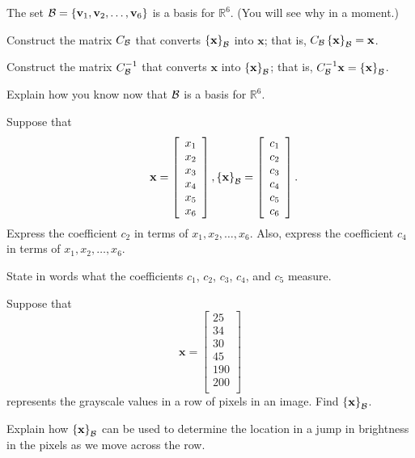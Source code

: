 \documentclass[12pt]{article}
\newcommand{\vs}[1]{\vspace{#1in}}
\newcommand{\vvec}{{\mathbf v}}
\newcommand{\xvec}{{\mathbf x}}
\newcommand{\real}{{\mathbb R}}
\newcommand{\bcal}{{\cal B}}
\newcommand{\coords}[2]{\left\{#1\right\}_{#2}}
\begin{document}
\begin{enumerate}
  The set $\bcal = \{\vvec_1, \vvec_2, \ldots, \vvec_6\}$ is a basis
  for $\real^6$.  (You will see why in a moment.)

  Construct the matrix $C_\bcal$ that converts $\coords{\xvec}{\bcal}$
  into $\xvec$;  that is, $C_\bcal\coords{\xvec}{\bcal} = \xvec$.

  \vs{1.25}
  Construct the matrix $C_\bcal^{-1}$ that converts $\xvec$ into
  $\coords{\xvec}{\bcal}$;  that is, $C_\bcal^{-1} \xvec =
  \coords{\xvec}{\bcal}$.

  \vs{1.25}
  Explain how you know now that $\bcal$ is a basis for $\real^6$.

  \vs{1}
  Suppose that
  $$
  \hspace*{24pt}
  \xvec =
  \left[
    \begin{array}{c}
      x_1 \\ x_2 \\ x_3 \\ x_4 \\ x_5 \\ x_6 \\
    \end{array}
  \right],
  \coords{\xvec}{\bcal} =
  \left[
    \begin{array}{c}
      c_1 \\ c_2 \\ c_3 \\ c_4 \\ c_5 \\ c_6 \\
    \end{array}
  \right].
  $$
  \newpage
  Express the coefficient $c_2$ in terms of $x_1, x_2, \ldots, x_6$.
  Also, express the coefficient $c_4$ in terms of $x_1, x_2, \ldots,
  x_6$.

  \vs{1}
  State in words what the coefficients $c_1$, $c_2$, $c_3$, $c_4$, and
  $c_5$ measure.

  \vs{1}
  Suppose that
  $$
  \xvec =
  \left[
    \begin{array}{c}
      25 \\ 34 \\ 30 \\ 45 \\ 190 \\ 200 \\
    \end{array}
  \right]
  $$
  represents the grayscale values in a row of pixels in an image.
  Find $\coords{\xvec}{\bcal}$.

  \vs{1}
  Explain how $\coords{\xvec}{\bcal}$ can be used to determine the
  location in a jump in brightness in the pixels as we move across the
  row.


\end{enumerate}
\end{document}
